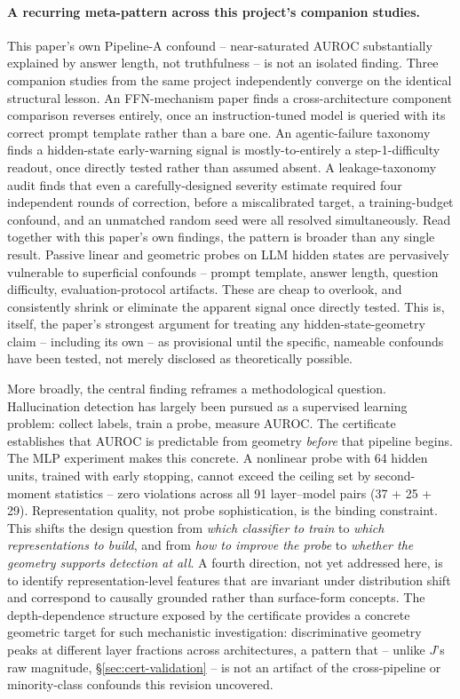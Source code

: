 \documentclass[onecolumn]{jmlr}
\begin{document}
\paragraph{A recurring meta-pattern across this project's companion
studies.} This paper's own Pipeline-A confound -- near-saturated AUROC
substantially explained by answer length, not truthfulness -- is not
an isolated finding. Three companion studies from the same project
independently converge on the identical structural lesson. An
FFN-mechanism paper finds a cross-architecture component comparison
reverses entirely, once an instruction-tuned model is queried with its
correct prompt template rather than a bare one. An agentic-failure
taxonomy finds a hidden-state early-warning signal is
mostly-to-entirely a step-1-difficulty readout, once directly tested
rather than assumed absent. A leakage-taxonomy audit finds that even a
carefully-designed severity estimate required four independent rounds
of correction, before a miscalibrated target, a training-budget
confound, and an unmatched random seed were all resolved
simultaneously. Read together with this paper's own findings, the
pattern is broader than any single result. Passive linear and
geometric probes on LLM hidden states are pervasively vulnerable to
superficial confounds -- prompt template, answer length, question
difficulty, evaluation-protocol artifacts. These are cheap to overlook,
and consistently shrink or eliminate the apparent signal once directly
tested. This is, itself, the paper's strongest argument for treating
any hidden-state-geometry claim -- including its own -- as provisional
until the specific, nameable confounds have been tested, not merely
disclosed as theoretically possible.

More broadly, the central finding reframes a methodological question.
Hallucination detection has largely been pursued as a supervised
learning problem: collect labels, train a probe, measure AUROC. The
certificate establishes that AUROC is predictable from geometry
\emph{before} that pipeline begins. The MLP experiment makes this
concrete. A nonlinear probe with 64 hidden units, trained with early
stopping, cannot exceed the ceiling set by second-moment statistics --
zero violations across all 91 layer--model pairs (37 + 25 + 29).
Representation quality, not probe sophistication, is the binding
constraint. This shifts the design question from \emph{which
classifier to train} to \emph{which representations to build}, and
from \emph{how to improve the probe} to \emph{whether the geometry
supports detection at all}. A fourth direction, not yet addressed
here, is to identify representation-level features that are invariant
under distribution shift and correspond to causally grounded rather
than surface-form concepts. The depth-dependence structure exposed by
the certificate provides a concrete geometric target for such
mechanistic investigation: discriminative geometry peaks at different
layer fractions across architectures, a pattern that -- unlike $J$'s
raw magnitude, \S\ref{sec:cert-validation} -- is not an artifact of the
cross-pipeline or minority-class confounds this revision uncovered.



\end{document}
